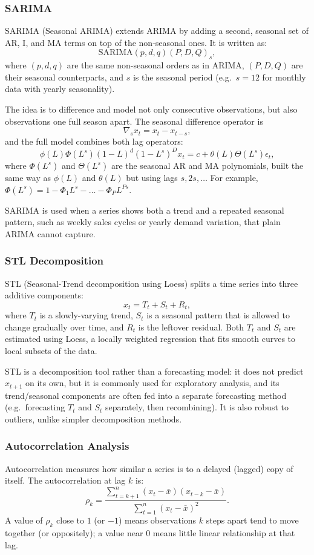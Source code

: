\documentclass[12pt,a4paper]{article}
\begin{document}
\subsubsection*{SARIMA}
SARIMA (Seasonal ARIMA) extends ARIMA by adding a second, seasonal set of AR, I, and MA terms on top of the non-seasonal ones. It is written as:
$$
\text{SARIMA}(p,d,q)(P,D,Q)_s,
$$
where $(p,d,q)$ are the same non-seasonal orders as in ARIMA, $(P,D,Q)$ are their seasonal counterparts, and $s$ is the seasonal period (e.g.\ $s=12$ for monthly data with yearly seasonality).

The idea is to difference and model not only consecutive observations, but also observations one full season apart. The seasonal difference operator is
$$
\nabla_s x_t = x_t - x_{t-s},
$$
and the full model combines both lag operators:
$$
\phi(L)\Phi(L^s)(1-L)^d(1-L^s)^D x_t = c + \theta(L)\Theta(L^s)\epsilon_t,
$$
where $\Phi(L^s)$ and $\Theta(L^s)$ are the seasonal AR and MA polynomials, built the same way as $\phi(L)$ and $\theta(L)$ but using lags $s,2s,\dots$ For example, $\Phi(L^s) = 1-\Phi_1L^s-\dots-\Phi_PL^{Ps}$.

SARIMA is used when a series shows both a trend and a repeated seasonal pattern, such as weekly sales cycles or yearly demand variation, that plain ARIMA cannot capture.


\subsubsection*{STL Decomposition}
STL (Seasonal-Trend decomposition using Loess) splits a time series into three additive components:
$$
x_t = T_t + S_t + R_t,
$$
where $T_t$ is a slowly-varying trend, $S_t$ is a seasonal pattern that is allowed to change gradually over time, and $R_t$ is the leftover residual. Both $T_t$ and $S_t$ are estimated using Loess, a locally weighted regression that fits smooth curves to local subsets of the data.

STL is a decomposition tool rather than a forecasting model: it does not predict $x_{t+1}$ on its own, but it is commonly used for exploratory analysis, and its trend/seasonal components are often fed into a separate forecasting method (e.g.\ forecasting $T_t$ and $S_t$ separately, then recombining). It is also robust to outliers, unlike simpler decomposition methods.

\subsubsection*{Autocorrelation Analysis}
Autocorrelation measures how similar a series is to a delayed (lagged) copy of itself. The autocorrelation at lag $k$ is:
$$
\rho_k =
\dfrac{\sum_{t=k+1}^{n}(x_t-\bar{x})(x_{t-k}-\bar{x})}
{\sum_{t=1}^{n}(x_t-\bar{x})^2}.
$$
A value of $\rho_k$ close to $1$ (or $-1$) means observations $k$ steps apart tend to move together (or oppositely); a value near $0$ means little linear relationship at that lag.
\end{document}
